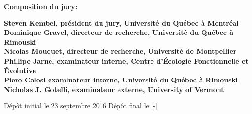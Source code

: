 \thispagestyle{empty}

\null
\vfill
\noindent \textbf{Composition du jury:}\\
\vspace{1cm}

\begin{singlespace}
  \noindent \textbf{Steven Kembel, président du jury, Université du Québec à Montréal}\\

  \noindent \textbf{Dominique Gravel, directeur de recherche, Université du Québec à Rimouski}\\

  \noindent \textbf{Nicolas Mouquet, directeur de recherche, Université de Montpellier}\\

  \noindent \textbf{Phillipe Jarne, examinateur interne, Centre d'Écologie Fonctionnelle et Évolutive}\\

  \noindent \textbf{Piero Calosi examinateur interne, Université du Québec à Rimouski}\\

  \noindent \textbf{Nicholas J. Gotelli, examinateur externe, University of Vermont}\\
\end{singlespace}

\vspace{2cm}
\noindent Dépôt initial le 23 septembre 2016
\hspace{3cm}
Dépôt final le [-]


\cleardoublepage
